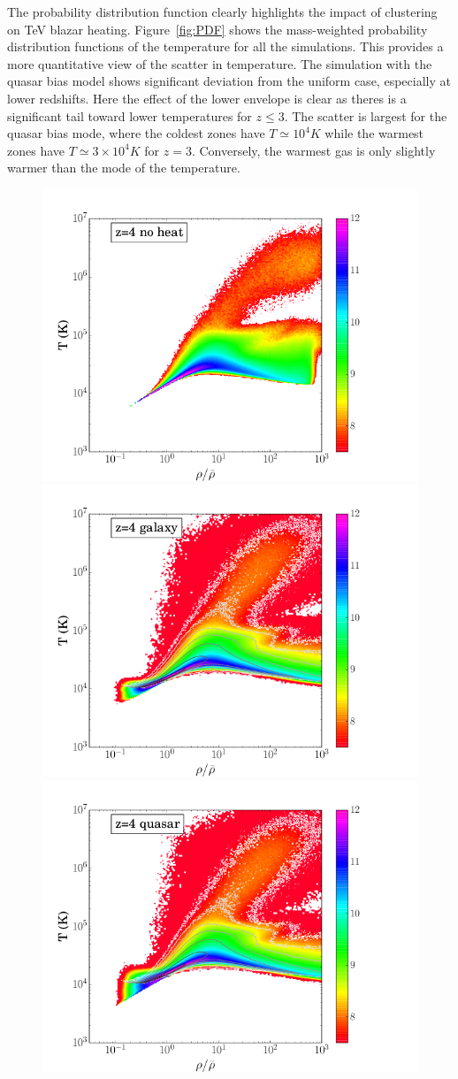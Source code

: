 \documentclass[numberedappendix]{emulateapj}
\begin{document}
The probability distribution function clearly highlights the impact of clustering on TeV blazar heating. Figure~\ref{fig:PDF} shows the mass-weighted probability distribution functions of the temperature for all the simulations. This provides a more quantitative view of the scatter in temperature. The simulation with the quasar bias model shows significant deviation from the uniform case, especially at lower redshifts. Here the effect of the lower envelope is clear as theres is a significant tail toward lower temperatures for $z \leqslant 3$. The scatter is largest for the quasar bias mode, where the coldest zones have $T\simeq 10^4K$ while the warmest zones have $T\simeq 3\times 10^4K$ for $z=3$. Conversely, the warmest gas is only slightly warmer than the mode of the temperature. 

\begin{figure}
\centering
\includegraphics[trim=.5cm 0cm 3cm .5cm, clip ,width = .32\textwidth ]{T_rho_noheat_z4.png}
\includegraphics[trim=.5cm 0cm 3cm .5cm, clip ,width = .32\textwidth ]{T_rho_gal_z4_512.png}
\includegraphics[trim=.5cm 0cm 3cm .5cm, clip ,width = .32\textwidth ]{T_rho_qso_z4_512.png}

\end{figure}
\end{document}
